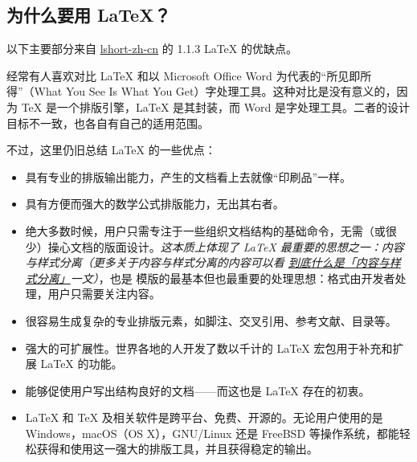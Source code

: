 
\subsection{为什么要用 \LaTeX{}？}

以下主要部分来自 \href{https://ctan.math.illinois.edu/info/lshort/chinese/lshort-zh-cn.pdf}{lshort-zh-cn} 的 1.1.3 \LaTeX{} 的优缺点。

经常有人喜欢对比 \LaTeX{} 和以 Microsoft Office Word 为代表的“所见即所得”（What You See Is What You Get）字处理工具。这种对比是没有意义的，因为 \TeX{} 是一个排版引擎，\LaTeX{} 是其封装，而 Word 是字处理工具。二者的设计目标不一致，也各自有自己的适用范围。

不过，这里仍旧总结 \LaTeX{} 的一些优点：
\begin{itemize}
  \item 具有专业的排版输出能力，产生的文档看上去就像“印刷品”一样。
  \item 具有方便而强大的数学公式排版能力，无出其右者。
  \item 绝大多数时候，用户只需专注于一些组织文档结构的基础命令，无需（或很少）操心文档的版面设计。\emph{这本质上体现了 \LaTeX{} 最重要的思想之一：内容与样式分离（更多关于内容与样式分离的内容可以看 \href{https://liam.page/2019/03/18/separation-of-content-and-presentation/}{到底什么是「内容与样式分离」}一文）}，也是  模版的最基本但也最重要的处理思想：格式由开发者处理，用户只需要关注内容。
  \item 很容易生成复杂的专业排版元素，如脚注、交叉引用、参考文献、目录等。
  \item 强大的可扩展性。世界各地的人开发了数以千计的 \LaTeX{} 宏包用于补充和扩展 \LaTeX{} 的功能。
  \item 能够促使用户写出结构良好的文档——而这也是 \LaTeX{} 存在的初衷。
  \item \LaTeX{} 和 \TeX{} 及相关软件是跨平台、免费、开源的。无论用户使用的是 Windows，macOS（OS X），GNU/Linux 还是 FreeBSD 等操作系统，都能轻松获得和使用这一强大的排版工具，并且获得稳定的输出。
\end{itemize}